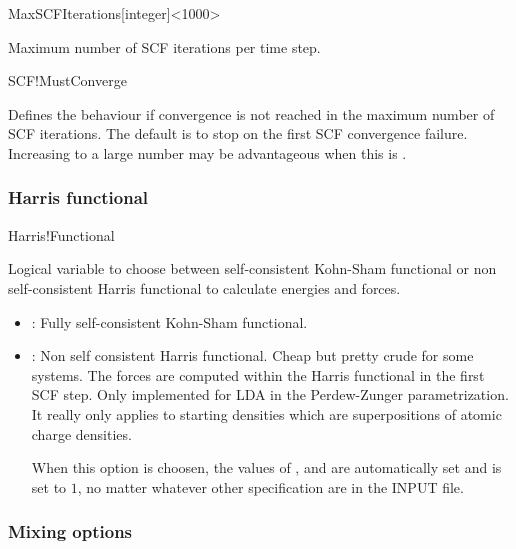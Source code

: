 \begin{fdfentry}{MaxSCFIterations}[integer]<1000>

  Maximum number of SCF iterations per time step. 
  
\end{fdfentry}

\begin{fdflogicalT}{SCF!MustConverge}

  Defines the behaviour if convergence is not reached in the maximum
  number of SCF iterations. The default is to stop on the first SCF
  convergence failure. Increasing  to a large
  number may be advantageous when this is \fdftrue.
  
\end{fdflogicalT}

\subsubsection{Harris functional}

\begin{fdflogicalF}{Harris!Functional}
  
  Logical variable to choose between self-consistent Kohn-Sham
  functional or non self-consistent Harris functional to calculate
  energies and forces.
  \begin{itemize}
    \item \fdffalse: Fully self-consistent Kohn-Sham functional.
    \item \fdftrue: Non self consistent Harris functional. Cheap but
    pretty crude for some systems. The forces are computed within the
    Harris functional in the first SCF step. Only implemented for LDA in
    the Perdew-Zunger parametrization. It really only applies to starting
    densities which are superpositions of atomic charge densities.

    When this option is choosen, the values of ,
     and  are automatically
    set \fdffalse and  is set to $1$, no matter
    whatever other specification are in the INPUT file.
  \end{itemize}

\end{fdflogicalF}


\subsubsection{Mixing options}

